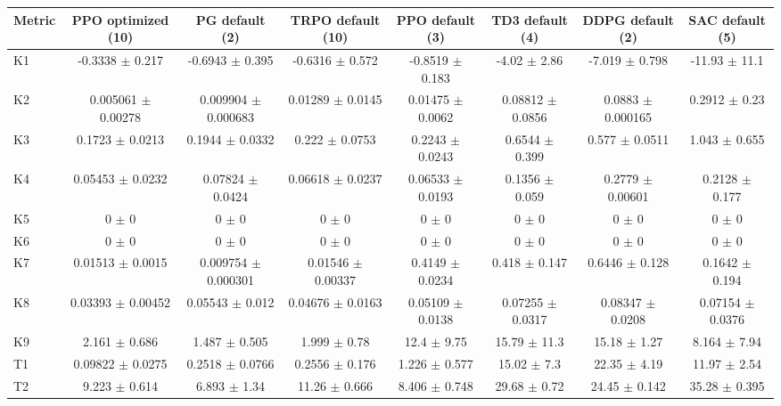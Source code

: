 \begin{tabular}{lccccccc}
\toprule
Metric & PPO optimized (10) & PG default (2) & TRPO default (10) & PPO default (3) & TD3 default (4) & DDPG default (2) & SAC default (5) \\
\midrule
K1 & -0.3338 $\pm$ 0.217 & -0.6943 $\pm$ 0.395 & -0.6316 $\pm$ 0.572 & -0.8519 $\pm$ 0.183 & -4.02 $\pm$ 2.86 & -7.019 $\pm$ 0.798 & -11.93 $\pm$ 11.1 \\
K2 & 0.005061 $\pm$ 0.00278 & 0.009904 $\pm$ 0.000683 & 0.01289 $\pm$ 0.0145 & 0.01475 $\pm$ 0.0062 & 0.08812 $\pm$ 0.0856 & 0.0883 $\pm$ 0.000165 & 0.2912 $\pm$ 0.23 \\
K3 & 0.1723 $\pm$ 0.0213 & 0.1944 $\pm$ 0.0332 & 0.222 $\pm$ 0.0753 & 0.2243 $\pm$ 0.0243 & 0.6544 $\pm$ 0.399 & 0.577 $\pm$ 0.0511 & 1.043 $\pm$ 0.655 \\
K4 & 0.05453 $\pm$ 0.0232 & 0.07824 $\pm$ 0.0424 & 0.06618 $\pm$ 0.0237 & 0.06533 $\pm$ 0.0193 & 0.1356 $\pm$ 0.059 & 0.2779 $\pm$ 0.00601 & 0.2128 $\pm$ 0.177 \\
K5 & 0 $\pm$ 0 & 0 $\pm$ 0 & 0 $\pm$ 0 & 0 $\pm$ 0 & 0 $\pm$ 0 & 0 $\pm$ 0 & 0 $\pm$ 0 \\
K6 & 0 $\pm$ 0 & 0 $\pm$ 0 & 0 $\pm$ 0 & 0 $\pm$ 0 & 0 $\pm$ 0 & 0 $\pm$ 0 & 0 $\pm$ 0 \\
K7 & 0.01513 $\pm$ 0.0015 & 0.009754 $\pm$ 0.000301 & 0.01546 $\pm$ 0.00337 & 0.4149 $\pm$ 0.0234 & 0.418 $\pm$ 0.147 & 0.6446 $\pm$ 0.128 & 0.1642 $\pm$ 0.194 \\
K8 & 0.03393 $\pm$ 0.00452 & 0.05543 $\pm$ 0.012 & 0.04676 $\pm$ 0.0163 & 0.05109 $\pm$ 0.0138 & 0.07255 $\pm$ 0.0317 & 0.08347 $\pm$ 0.0208 & 0.07154 $\pm$ 0.0376 \\
K9 & 2.161 $\pm$ 0.686 & 1.487 $\pm$ 0.505 & 1.999 $\pm$ 0.78 & 12.4 $\pm$ 9.75 & 15.79 $\pm$ 11.3 & 15.18 $\pm$ 1.27 & 8.164 $\pm$ 7.94 \\
T1 & 0.09822 $\pm$ 0.0275 & 0.2518 $\pm$ 0.0766 & 0.2556 $\pm$ 0.176 & 1.226 $\pm$ 0.577 & 15.02 $\pm$ 7.3 & 22.35 $\pm$ 4.19 & 11.97 $\pm$ 2.54 \\
T2 & 9.223 $\pm$ 0.614 & 6.893 $\pm$ 1.34 & 11.26 $\pm$ 0.666 & 8.406 $\pm$ 0.748 & 29.68 $\pm$ 0.72 & 24.45 $\pm$ 0.142 & 35.28 $\pm$ 0.395 \\
\bottomrule
\end{tabular}
